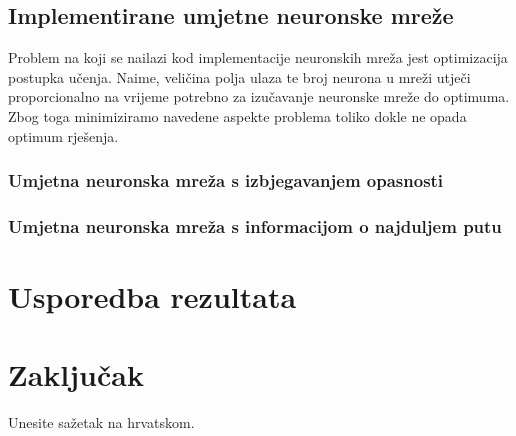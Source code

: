 \documentclass[zavrsnirad]{fer}
\begin{document}
\section{Implementirane umjetne neuronske mreže}
\label{pog:neuronske}
Problem na koji se nailazi kod implementacije neuronskih mreža jest optimizacija postupka učenja. Naime, veličina polja ulaza te broj neurona u mreži utječi proporcionalno na vrijeme potrebno za izučavanje neuronske mreže do optimuma. Zbog toga minimiziramo navedene aspekte problema toliko dokle ne opada optimum rješenja.

\subsection{Umjetna neuronska mreža s izbjegavanjem opasnosti}
\label{pog:neuronska_opasnost}

\subsection{Umjetna neuronska mreža s informacijom o najduljem putu}
\label{pog:neuronska_najdulji}

\chapter{Usporedba rezultata}
\label{pog:usporedba_rezultata}

\Blindtext


\chapter{Zaključak}
\label{pog:zakljucak}

\blindtext








\begin{sazetak}
  Unesite sažetak na hrvatskom.

  \blindtext
\end{sazetak}
\end{document}
